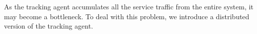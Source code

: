 As the tracking agent accumulates all the service traffic from the entire system, it may become a bottleneck. To deal with this problem, we introduce a distributed version of the tracking agent.






